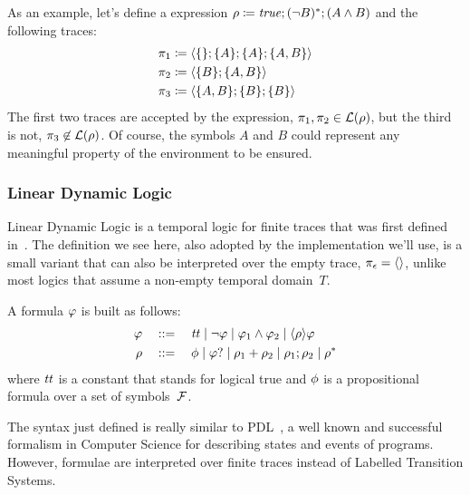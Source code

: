 \begin{example}
	As an example, let's define a \re{} expression $\rho \coloneqq \text{\textit{true}};
	(\neg B)^*; (A \land B)$ and the following traces:
	\begin{align*}
		\pi_1 &\coloneqq \langle \{\}; \{A\}; \{A\}; \{A,B\} \rangle \\
		\pi_2 &\coloneqq \langle \{B\}; \{A,B\} \rangle \\
		\pi_3 &\coloneqq \langle \{A, B\}; \{B\}; \{B\} \rangle \\
	\end{align*}
	The first two traces are accepted by the expression, $\pi_1, \pi_2 \in
	\mathcal{L}(\rho)$, but the third is not, $\pi_3 \not\in
	\mathcal{L}(\rho)$. Of course, the symbols $A$ and $B$ could represent any
	meaningful property of the environment to be ensured.
\end{example}


\subsubsection{Linear Dynamic Logic}

Linear Dynamic Logic is a temporal logic for finite traces that was first
defined in~\cite{bib:ltlf-ldlf}. The definition we see here, also adopted by
the implementation we'll use, is a small variant that can also be interpreted
over the empty trace, $\pi_\epsilon = \langle \rangle$, unlike most logics
that assume a non-empty temporal domain~$T$.

\begin{definition}
	A \ldl{} formula $\varphi$ is built as follows:
	\begin{equation}
	\begin{aligned}
		\varphi \quad &::= \quad \text{\textit{tt}} \mid \neg \varphi \mid \varphi_1 \land
			\varphi_2 \mid \langle \rho \rangle \varphi \\
		\rho \quad &::= \quad \phi \mid \varphi? \mid \rho_1 +
			\rho_2 \mid \rho_1; \rho_2 \mid \rho^* \\
	\end{aligned}
	\label{eq:ldl-syntax}
	\end{equation}
	where $\text{\textit{tt}}$ is a constant that stands for logical true and $\phi$
	is a propositional formula over a set of symbols~$\mathcal{F}$.
\end{definition}

The syntax just defined is really similar to PDL~\cite{bib:pdl}, a well known
and successful formalism in Computer Science for describing states and events
of programs. However, \ldl{} formulae are interpreted over finite traces
instead of Labelled Transition Systems.

